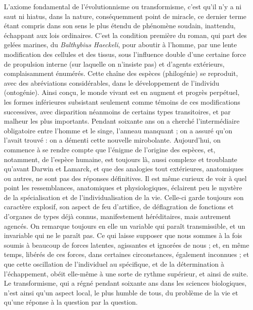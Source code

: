 \documentclass[french,twoside]{book} %
\begin{document}
L’axiome fondamental de l’évolutionnisme ou transformisme, c’est qu’il n’y a ni saut ni hiatus, dans la nature, conséquemment point de miracle, ce dernier terme étant compris dans son sens le plus étendu de phénomène soudain, inattendu, échappant aux lois ordinaires. C’est la condition première du roman, qui part des gelées marines, du {\itshape Balthybius Haeckeli}, pour aboutir à l’homme, par une lente modification des cellules et des tissus, sous l’influence double d’une certaine force de propulsion interne (sur laquelle on n’insiste pas) et d’agents extérieurs, complaisamment énumérés. Cette chaîne des espèces (philogénie) se reproduit, avec des abréviations considérables, dans le développement de l’individu (ontogénie). Ainsi conçu, le monde vivant est en augment et progrès perpétuel, les formes inférieures subsistant seulement comme témoins de ces modifications successives, avec disparition néanmoins de certains types transitoires, et par malheur les plus importants. Pendant soixante ans on a cherché l’intermédiaire obligatoire entre l’homme et le singe, l’anneau manquant ; on a assuré qu’on l’avait trouvé : on a démenti cette nouvelle mirobolante. Aujourd’hui, on commence à se rendre compte que l’énigme de l’origine des espèces, et, notamment, de l’espèce humaine, est toujours là, aussi complexe et troublante qu’avant Darwin et Lamarck, et que des analogies tout extérieures, anatomiques ou autres, ne sont pas des réponses définitives. Il est même curieux de voir à quel point les ressemblances, anatomiques et physiologiques, éclairent peu le mystère de la spécialisation et de l’individualisation de la vie. Celle-ci garde toujours son caractère explosif, son aspect de feu d’artifice, de déflagration de fonctions et d’organes de types déjà connus, manifestement héréditaires, mais autrement agencés. On remarque toujours en elle un variable qui paraît transmissible, et un invariable qui ne le paraît pas. Ce qui laisse supposer que nous sommes à la fois soumis à beaucoup de forces latentes, agissantes et ignorées de nous ; et, en même temps, libérés de ces forces, dans certaines circonstances, également inconnues ; et que cette oscillation de l’individuel au spécifique, et de la détermination à l’échappement, obéit elle-même à une sorte de rythme supérieur, et ainsi de suite. Le transformisme, qui a régné pendant soixante ans dans les sciences biologiques, n’est ainsi qu’un aspect local, le plus humble de tous, du problème de la vie et qu’une réponse à la question par la question.\par
\end{document}
